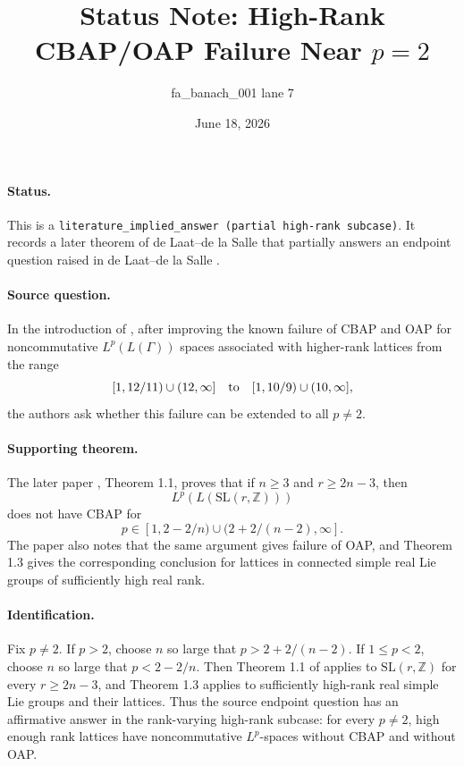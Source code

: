\documentclass[11pt]{article}
\title{Status Note: High-Rank CBAP/OAP Failure Near \(p=2\)}
\author{fa\_banach\_001 lane 7}
\date{June 18, 2026}
\begin{document}
\maketitle

\paragraph{Status.}
This is a \texttt{literature\_implied\_answer (partial high-rank subcase)}.
It records a later theorem of de Laat--de la Salle \cite{dLdlS2014} that
partially answers an endpoint question raised in de Laat--de la Salle
\cite{dLdlS2015}.

\paragraph{Source question.}
In the introduction of \cite{dLdlS2015}, after improving the known failure of
CBAP and OAP for noncommutative \(L^p(L(\Gamma))\) spaces associated with
higher-rank lattices from the range
\[
  [1,12/11)\cup(12,\infty]
  \quad\hbox{to}\quad
  [1,10/9)\cup(10,\infty],
\]
the authors ask whether this failure can be extended to all \(p\neq 2\).

\paragraph{Supporting theorem.}
The later paper \cite{dLdlS2014}, Theorem 1.1, proves that if \(n\ge 3\) and
\(r\ge 2n-3\), then
\[
  L^p(L(\mathrm{SL}(r,\mathbb Z)))
\]
does not have CBAP for
\[
  p\in [1,2-2/n)\cup(2+2/(n-2),\infty].
\]
The paper also notes that the same argument gives failure of OAP, and Theorem
1.3 gives the corresponding conclusion for lattices in connected simple real
Lie groups of sufficiently high real rank.

\paragraph{Identification.}
Fix \(p\neq 2\).  If \(p>2\), choose \(n\) so large that
\(p>2+2/(n-2)\).  If \(1\le p<2\), choose \(n\) so large that
\(p<2-2/n\).  Then Theorem 1.1 of \cite{dLdlS2014} applies to
\(\mathrm{SL}(r,\mathbb Z)\) for every \(r\ge 2n-3\), and Theorem 1.3 applies
to sufficiently high-rank real simple Lie groups and their lattices.  Thus the
source endpoint question has an affirmative answer in the rank-varying
high-rank subcase: for every \(p\neq 2\), high enough rank lattices have
noncommutative \(L^p\)-spaces without CBAP and without OAP.
\end{document}
